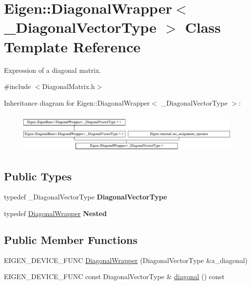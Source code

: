 \hypertarget{class_eigen_1_1_diagonal_wrapper}{}\section{Eigen\+::Diagonal\+Wrapper$<$ \+\_\+\+Diagonal\+Vector\+Type $>$ Class Template Reference}
\label{class_eigen_1_1_diagonal_wrapper}


Expression of a diagonal matrix.  




{\ttfamily \#include $<$Diagonal\+Matrix.\+h$>$}

Inheritance diagram for Eigen\+::Diagonal\+Wrapper$<$ \+\_\+\+Diagonal\+Vector\+Type $>$\+:\begin{figure}[H]
\begin{center}
\leavevmode
\includegraphics[height=2.068965cm]{class_eigen_1_1_diagonal_wrapper}
\end{center}
\end{figure}
\subsection*{Public Types}
\begin{DoxyCompactItemize}
\item 
\mbox{\label{class_eigen_1_1_diagonal_wrapper_ad145dc440c9a425857f8e1e5e0ae0294}} 
typedef \+\_\+\+Diagonal\+Vector\+Type {\bfseries Diagonal\+Vector\+Type}
\item 
\mbox{\label{class_eigen_1_1_diagonal_wrapper_a2d709c0cbb450dd9a8463dffcab5fb3d}} 
typedef \mbox{\hyperlink{class_eigen_1_1_diagonal_wrapper}{Diagonal\+Wrapper}} {\bfseries Nested}
\end{DoxyCompactItemize}
\subsection*{Public Member Functions}
\begin{DoxyCompactItemize}
\item 
E\+I\+G\+E\+N\+\_\+\+D\+E\+V\+I\+C\+E\+\_\+\+F\+U\+NC \mbox{\hyperlink{class_eigen_1_1_diagonal_wrapper_a81574f47272fd5e519a19135a306529d}{Diagonal\+Wrapper}} (Diagonal\+Vector\+Type \&a\+\_\+diagonal)
\item 
E\+I\+G\+E\+N\+\_\+\+D\+E\+V\+I\+C\+E\+\_\+\+F\+U\+NC const Diagonal\+Vector\+Type \& \mbox{\hyperlink{class_eigen_1_1_diagonal_wrapper_a8e84e44aa74ab66f54ffb45e439ef0d5}{diagonal}} () const
\end{DoxyCompactItemize}
